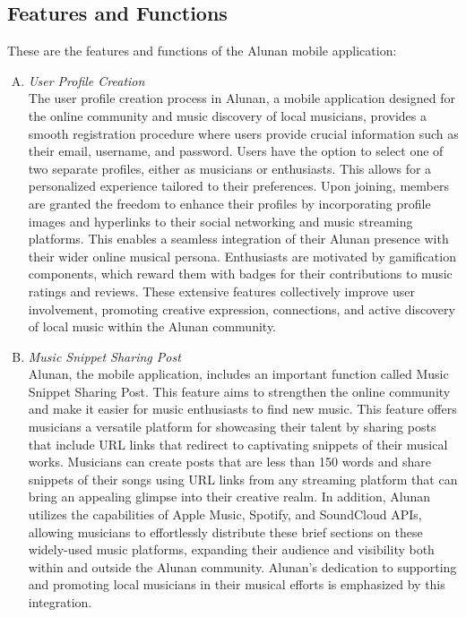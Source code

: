 \subsection{Features and Functions}
These are the features and functions of the Alunan mobile application:
\begin{enumerate}[A.]
    \item \textit{User Profile Creation}\\
    The user profile creation process in Alunan, a mobile application designed for the online community and music discovery of local musicians, provides a smooth registration procedure where users provide crucial information such as their email, username, and password. Users have the option to select one of two separate profiles, either as musicians or enthusiasts. This allows for a personalized experience tailored to their preferences. Upon joining, members are granted the freedom to enhance their profiles by incorporating profile images and hyperlinks to their social networking and music streaming platforms. This enables a seamless integration of their Alunan presence with their wider online musical persona. Enthusiasts are motivated by gamification components, which reward them with badges for their contributions to music ratings and reviews. These extensive features collectively improve user involvement, promoting creative expression, connections, and active discovery of local music within the Alunan community.
    \item \textit{Music Snippet Sharing Post}\\
    Alunan, the mobile application, includes an important function called Music Snippet Sharing Post. This feature aims to strengthen the online community and make it easier for music enthusiasts to find new music. This feature offers musicians a versatile platform for showcasing their talent by sharing posts that include URL links that redirect to captivating snippets of their musical works. Musicians can create posts that are less than 150 words and share snippets of their songs using URL links from any streaming platform that can bring an appealing glimpse into their creative realm. In addition, Alunan utilizes the capabilities of Apple Music, Spotify, and SoundCloud APIs, allowing musicians to effortlessly distribute these brief sections on these widely-used music platforms, expanding their audience and visibility both within and outside the Alunan community. Alunan's dedication to supporting and promoting local musicians in their musical efforts is emphasized by this integration.

\end{enumerate}
